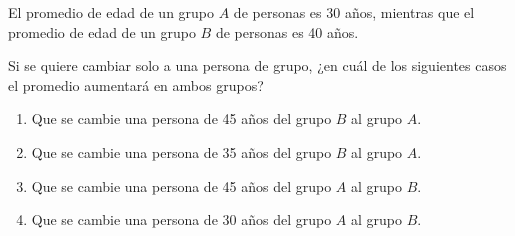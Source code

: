 \begin{problem}
    El promedio de edad de un grupo $A$ de personas es 30 años, mientras que el promedio de edad de un grupo $B$ de personas es 40 años.

    Si se quiere cambiar solo a una persona de grupo, ¿en cuál de los siguientes casos el promedio aumentará en ambos grupos?

    \begin{enumerate}[label=\Alph*.]
        \item Que se cambie una persona de 45 años del grupo $B$ al grupo $A$.
        \item Que se cambie una persona de 35 años del grupo $B$ al grupo $A$.
        \item Que se cambie una persona de 45 años del grupo $A$ al grupo $B$.
        \item Que se cambie una persona de 30 años del grupo $A$ al grupo $B$.
    \end{enumerate}
\end{problem}
